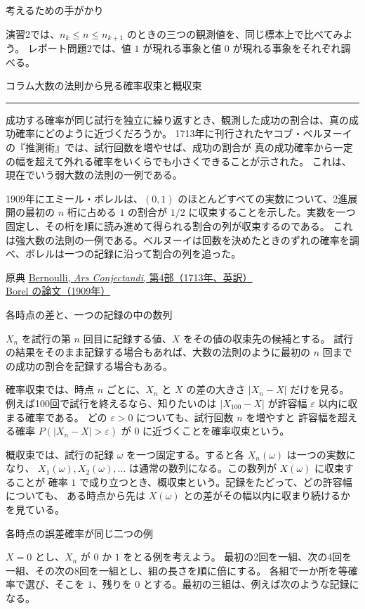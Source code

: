 \documentclass[a4paper,10pt,pdflatex,ja=standard,jafont=ipaex-type1,
  magstyle=real,scale=1]{bxjsarticle}
\newcommand{\coursename}{確率論と統計学 I}
\newcommand{\topic}[1]{\par\vspace{5pt}
  {\large\sffamily\mdseries\color{accent}#1}\par\vspace{2pt}}
\newcommand{\handouttitle}[1]{%
  \begin{center}
    {\Large\color{ink}#1}\par\vspace{3mm}
    {\color{accent}\rule{0.88\linewidth}{0.7pt}}
  \end{center}\vspace{-2mm}}
\newcommand{\columnheading}[1]{\par\vspace{5pt}
  {\fontsize{11pt}{15pt}\selectfont\sffamily\mdseries\color{accent}#1}\par\vspace{2pt}}
\newcommand{\columnstart}[1]{\clearpage
  \setlength{\parskip}{2.5pt}
  \fancyhead[L]{\small\color{ink}\coursename{}・コラム}
  \handouttitle{コラム\quad #1}}
\begin{document}
\topic{考えるための手がかり}
演習2では、$n_k\le n\le n_{k+1}$ のときの三つの観測値を、同じ標本上で比べてみよう。
レポート問題2では、値 $1$ が現れる事象と値 $0$ が現れる事象をそれぞれ調べる。

\columnstart{大数の法則から見る確率収束と概収束}
成功する確率が同じ試行を独立に繰り返すとき、観測した成功の割合は、真の成功確率にどのように近づくだろうか。
1713年に刊行されたヤコブ・ベルヌーイの『推測術』では、試行回数を増やせば、成功の割合が
真の成功確率から一定の幅を超えて外れる確率をいくらでも小さくできることが示された。
これは、現在でいう弱大数の法則の一例である。

1909年にエミール・ボレルは、$(0,1)$ のほとんどすべての実数について、2進展開の最初の $n$ 桁に占める $1$ の割合が
$1/2$ に収束することを示した。実数を一つ固定し、その桁を順に読み進めて得られる割合の列が収束するのである。
これは強大数の法則の一例である。ベルヌーイは回数を決めたときのずれの確率を調べ、ボレルは一つの記録に沿って割合の列を追った。

{\small\color{muted}
原典\quad
\href{https://www.gtfp.cs.rhul.ac.uk/sheynin/008_bernoulli.pdf}{Bernoulli, \textit{Ars Conjectandi}, 第4部（1713年、英訳）}
\qquad
\href{https://doi.org/10.1007/BF03019651}{Borel の論文（1909年）}}

\columnheading{各時点の差と、一つの記録の中の数列}
$X_n$ を試行の第 $n$ 回目に記録する値、$X$ をその値の収束先の候補とする。
試行の結果をそのまま記録する場合もあれば、大数の法則のように最初の $n$ 回までの成功の割合を記録する場合もある。

確率収束では、時点 $n$ ごとに、$X_n$ と $X$ の差の大きさ $|X_n-X|$ だけを見る。
例えば100回で試行を終えるなら、知りたいのは $|X_{100}-X|$ が許容幅 $\varepsilon$ 以内に収まる確率である。
どの $\varepsilon>0$ についても、試行回数 $n$ を増やすと
許容幅を超える確率 $P(|X_n-X|>\varepsilon)$ が $0$ に近づくことを確率収束という。

概収束では、試行の記録 $\omega$ を一つ固定する。すると各 $X_n(\omega)$ は一つの実数になり、
$X_1(\omega),X_2(\omega),\ldots$ は通常の数列になる。この数列が $X(\omega)$ に収束することが
確率 $1$ で成り立つとき、概収束という。記録をたどって、どの許容幅についても、
ある時点から先は $X(\omega)$ との差がその幅以内に収まり続けるかを見ている。

\columnheading{各時点の誤差確率が同じ二つの例}
$X=0$ とし、$X_n$ が $0$ か $1$ をとる例を考えよう。
最初の2回を一組、次の4回を一組、その次の8回を一組とし、組の長さを順に倍にする。
各組で一か所を等確率で選び、そこを $1$、残りを $0$ とする。最初の三組は、例えば次のような記録になる。
\end{document}
